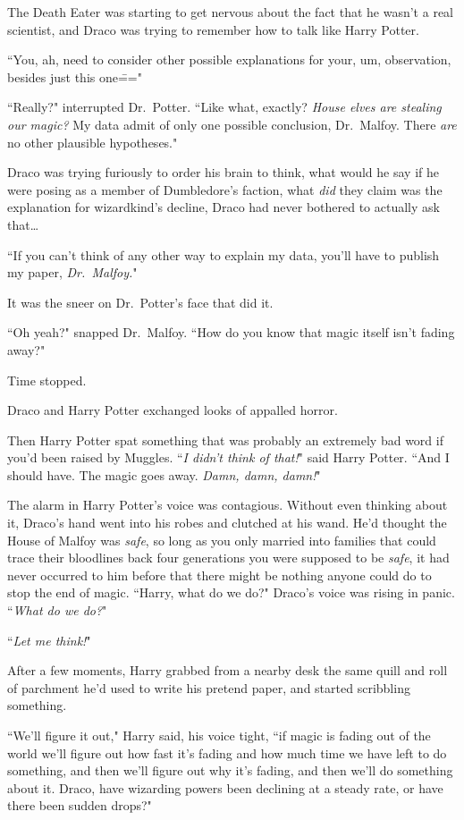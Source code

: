 The Death Eater was starting to get nervous about the fact that he wasn't a real scientist, and Draco was trying to remember how to talk like Harry Potter.

``You, ah, need to consider other possible explanations for your, um, observation, besides just this one\==="

``Really?" interrupted Dr.~Potter. ``Like what, exactly? \emph{House elves are stealing our magic?} My data admit of only one possible conclusion, Dr.~Malfoy. There \emph{are} no other plausible hypotheses."

Draco was trying furiously to order his brain to think, what would he say if he were posing as a member of Dumbledore's faction, what \emph{did} they claim was the explanation for wizardkind's decline, Draco had never bothered to actually ask that{\ldots}

``If you can't think of any other way to explain my data, you'll have to publish my paper, \emph{Dr.~Malfoy.}"

It was the sneer on Dr.~Potter's face that did it.

``Oh yeah?" snapped Dr.~Malfoy. ``How do you know that magic itself isn't fading away?"

Time stopped.

Draco and Harry Potter exchanged looks of appalled horror.

Then Harry Potter spat something that was probably an extremely bad word if you'd been raised by Muggles. ``\emph{I didn't think of that!}" said Harry Potter. ``And I should have. The magic goes away. \emph{Damn, damn, damn!}"

The alarm in Harry Potter's voice was contagious. Without even thinking about it, Draco's hand went into his robes and clutched at his wand. He'd thought the House of Malfoy was \emph{safe}, so long as you only married into families that could trace their bloodlines back four generations you were supposed to be \emph{safe}, it had never occurred to him before that there might be nothing anyone could do to stop the end of magic. ``Harry, what do we do?" Draco's voice was rising in panic. ``\emph{What do we do?}"

``\emph{Let me think!}"

After a few moments, Harry grabbed from a nearby desk the same quill and roll of parchment he'd used to write his pretend paper, and started scribbling something.

``We'll figure it out," Harry said, his voice tight, ``if magic is fading out of the world we'll figure out how fast it's fading and how much time we have left to do something, and then we'll figure out why it's fading, and then we'll do something about it. Draco, have wizarding powers been declining at a steady rate, or have there been sudden drops?"

